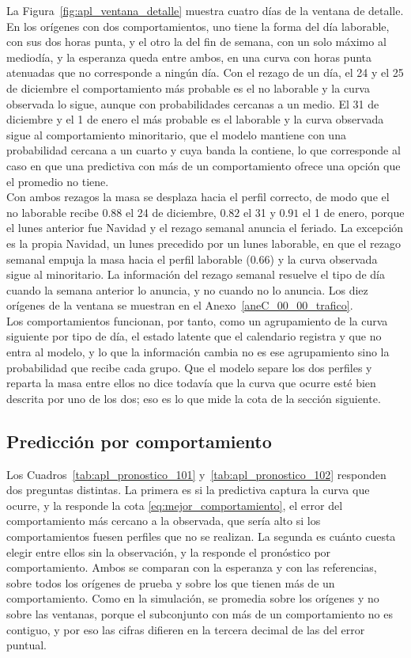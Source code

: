 La Figura~\ref{fig:apl_ventana_detalle} muestra cuatro días de la ventana de detalle. En los orígenes con dos comportamientos, uno tiene la forma del día laborable, con sus dos horas punta, y el otro la del fin de semana, con un solo máximo al mediodía, y la esperanza queda entre ambos, en una curva con horas punta atenuadas que no corresponde a ningún día. Con el rezago de un día, el 24 y el 25 de diciembre el comportamiento más probable es el no laborable y la curva observada lo sigue, aunque con probabilidades cercanas a un medio. El 31 de diciembre y el 1 de enero el más probable es el laborable y la curva observada sigue al comportamiento minoritario, que el modelo mantiene con una probabilidad cercana a un cuarto y cuya banda la contiene, lo que corresponde al caso en que una predictiva con más de un comportamiento ofrece una opción que el promedio no tiene.\\

Con ambos rezagos la masa se desplaza hacia el perfil correcto, de modo que el no laborable recibe $0.88$ el 24 de diciembre, $0.82$ el 31 y $0.91$ el 1 de enero, porque el lunes anterior fue Navidad y el rezago semanal anuncia el feriado. La excepción es la propia Navidad, un lunes precedido por un lunes laborable, en que el rezago semanal empuja la masa hacia el perfil laborable ($0.66$) y la curva observada sigue al minoritario. La información del rezago semanal resuelve el tipo de día cuando la semana anterior lo anuncia, y no cuando no lo anuncia. Los diez orígenes de la ventana se muestran en el Anexo~\ref{aneC_00_00_trafico}.\\

Los comportamientos funcionan, por tanto, como un agrupamiento de la curva siguiente por tipo de día, el estado latente que el calendario registra y que no entra al modelo, y lo que la información cambia no es ese agrupamiento sino la probabilidad que recibe cada grupo. Que el modelo separe los dos perfiles y reparta la masa entre ellos no dice todavía que la curva que ocurre esté bien descrita por uno de los dos; eso es lo que mide la cota de la sección siguiente.

\subsection{Predicción por comportamiento}
\label{04_03_04_pronostico}

Los Cuadros~\ref{tab:apl_pronostico_101} y~\ref{tab:apl_pronostico_102} responden dos preguntas distintas. La primera es si la predictiva captura la curva que ocurre, y la responde la cota \eqref{eq:mejor_comportamiento}, el error del comportamiento más cercano a la observada, que sería alto si los comportamientos fuesen perfiles que no se realizan. La segunda es cuánto cuesta elegir entre ellos sin la observación, y la responde el pronóstico por comportamiento. Ambos se comparan con la esperanza y con las referencias, sobre todos los orígenes de prueba y sobre los que tienen más de un comportamiento. Como en la simulación, se promedia sobre los orígenes y no sobre las ventanas, porque el subconjunto con más de un comportamiento no es contiguo, y por eso las cifras difieren en la tercera decimal de las del error puntual.

